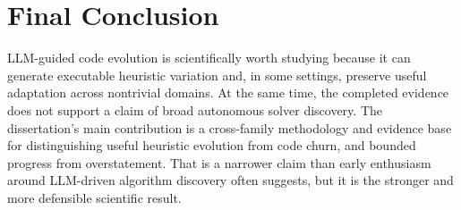 \section{Final Conclusion}
\label{sec:conclusion-final}

LLM-guided code evolution is scientifically worth studying because it can generate executable
heuristic variation and, in some settings, preserve useful adaptation across nontrivial domains.
At the same time, the completed evidence does not support a claim of broad autonomous solver
discovery. The dissertation's main contribution is a cross-family methodology and evidence base
for distinguishing useful heuristic evolution from code churn, and bounded progress from
overstatement. That is a narrower claim than early enthusiasm around LLM-driven algorithm
discovery often suggests, but it is the stronger and more defensible scientific result.

